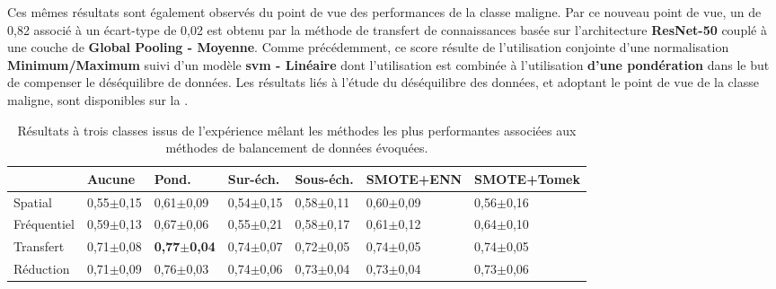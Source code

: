 Ces mêmes résultats sont également observés du point de vue des performances de la classe maligne. Par ce nouveau point de vue, un \fscore{} de 0,82 associé à un écart-type de 0,02 est obtenu par la méthode de transfert de connaissances basée sur l'architecture \textbf{ResNet-50} couplé à une couche de \textbf{Global Pooling - Moyenne}. Comme précédemment, ce score résulte de l'utilisation conjointe d'une normalisation \textbf{Minimum/Maximum} suivi d'un modèle \textbf{\gls{svm} - Linéaire} dont l'utilisation est combinée à l'utilisation \textbf{d'une pondération} dans le but de compenser le déséquilibre de données. Les résultats liés à l'étude du déséquilibre des données, et adoptant le point de vue de la classe maligne, sont disponibles sur la .\par

\begin{table}[H]
    \begin{tabular}{lllllll}
        \toprule
                    & Aucune        & Pond.                 & Sur-éch.      & Sous-éch.     & SMOTE+ENN     & SMOTE+Tomek   \\ \hline
        Spatial     & 0,55$\pm$0,15 & 0,61$\pm$0,09         & 0,54$\pm$0,15 & 0,58$\pm$0,11 & 0,60$\pm$0,09 & 0,56$\pm$0,16 \\
        Fréquentiel & 0,59$\pm$0,13 & 0,67$\pm$0,06         & 0,55$\pm$0,21 & 0,58$\pm$0,17 & 0,61$\pm$0,12 & 0,64$\pm$0,10 \\ \rowcolor[HTML]{E7E6E6}
        Transfert   & 0,71$\pm$0,08 & \textbf{0,77$\pm$0,04}& 0,74$\pm$0,07 & 0,72$\pm$0,05 & 0,74$\pm$0,05 & 0,74$\pm$0,05 \\
        Réduction   & 0,71$\pm$0,09 & 0,76$\pm$0,03         & 0,74$\pm$0,06 & 0,73$\pm$0,04 & 0,73$\pm$0,04 & 0,73$\pm$0,06 \\ \bottomrule
    \end{tabular}
    \caption{Résultats à trois classes issus de l'expérience mêlant les méthodes les plus performantes associées aux méthodes de balancement de données évoquées.}
    \label{tab:results_balancement_multi}
\end{table}\par

